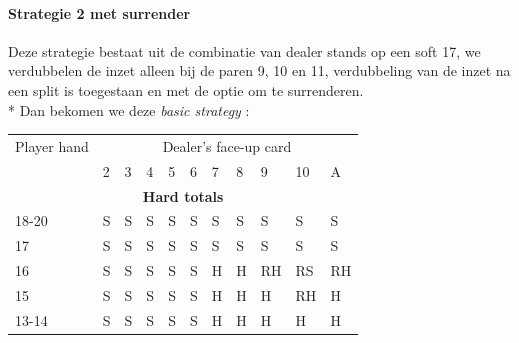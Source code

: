 \documentclass[conference]{IEEEtran}
\begin{document}
\paragraph{Strategie 2 met surrender}

Deze strategie bestaat uit de combinatie van dealer stands op een soft 17, we verdubbelen de inzet alleen bij de paren 9, 10 en 11, verdubbeling van de inzet na een split is toegestaan en met de optie om te surrenderen.\\*
Dan bekomen we deze \textit{basic strategy} :

\begin{table}[ht]
\tiny
\centering
\begin{tabular}{|l|l|l|l|l|l|l|l|l|l|l|}
\hline

{Player hand} & \multicolumn{10}{c|}{Dealer's face-up card}     \\ \cline{2-11} 
                             & 2 & 3 & 4 & 5 & 6 & 7 & 8 & 9 & 10 & A \\ \hline
\multicolumn{11}{|c|}{\textbf{Hard totals}}                           \\ \hline
18-20       								 & \cellcolor{red!75}S & \cellcolor{red!75}S & \cellcolor{red!75}S & \cellcolor{red!75}S & \cellcolor{red!75}S & \cellcolor{red!75}S & \cellcolor{red!75}S & \cellcolor{red!75}S & \cellcolor{red!75}S & \cellcolor{red!75}S  \\ \hline
17                           & \cellcolor{red!75}S & \cellcolor{red!75}S & \cellcolor{red!75}S & \cellcolor{red!75}S & \cellcolor{red!75}S & \cellcolor{red!75}S & \cellcolor{red!75}S & \cellcolor{red!75}S & \cellcolor{red!75}S & \cellcolor{red!75}S  \\ \hline
16                           & \cellcolor{red!75}S & \cellcolor{red!75}S & \cellcolor{red!75}S & \cellcolor{red!75}S & \cellcolor{red!75}S & \cellcolor{green!50}H & \cellcolor{green!50}H & \cellcolor{magenta!80}RH & \cellcolor{magenta!80}RS & \cellcolor{magenta!80}RH  \\ \hline
15                           & \cellcolor{red!75}S & \cellcolor{red!75}S & \cellcolor{red!75}S & \cellcolor{red!75}S & \cellcolor{red!75}S & \cellcolor{green!50}H & \cellcolor{green!50}H & \cellcolor{green!50}H & \cellcolor{magenta!80}RH & \cellcolor{green!50}H  \\ \hline
13-14                        & \cellcolor{red!75}S & \cellcolor{red!75}S & \cellcolor{red!75}S & \cellcolor{red!75}S & \cellcolor{red!75}S & \cellcolor{green!50}H & \cellcolor{green!50}H & \cellcolor{green!50}H & \cellcolor{green!50}H & \cellcolor{green!50}H  \\ \hline

\end{tabular}
\end{table}
\end{document}
